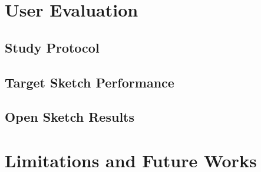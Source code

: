 \section{User Evaluation}
\subsection{Study Protocol}
\subsection{Target Sketch Performance}
\subsection{Open Sketch Results}

\section{Limitations and Future Works}


